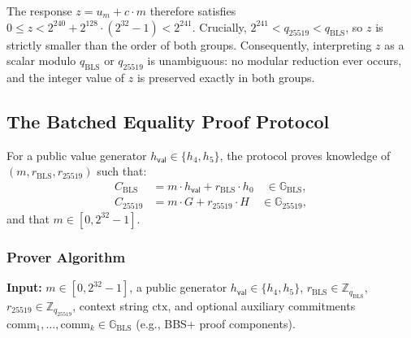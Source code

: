 \documentclass[11pt]{article}
\theoremstyle{definitionstyle}
\theoremstyle{plain}
\begin{document}
The response $z = u_m + c \cdot m$ therefore satisfies $0 \le z < 2^{240} + 2^{128} \cdot (2^{32}-1) < 2^{241}$. Crucially, $2^{241} < q_{25519} < q_{\text{BLS}}$, so $z$ is strictly smaller than the order of both groups. Consequently, interpreting $z$ as a scalar modulo $q_{\text{BLS}}$ or $q_{25519}$ is unambiguous: no modular reduction ever occurs, and the integer value of $z$ is preserved exactly in both groups.

\subsection{The Batched Equality Proof Protocol}
\label{sec:crosscurve}

For a public value generator $h_{\mathsf{val}} \in \{h_4, h_5\}$, the protocol proves knowledge of $(m, r_{\text{BLS}}, r_{25519})$ such that:
\[
\begin{aligned}
C_{\text{BLS}} &= m \cdot h_{\mathsf{val}} + r_{\text{BLS}} \cdot h_0 \quad \in \mathbb{G}_{\text{BLS}}, \\
C_{25519} &= m \cdot G + r_{25519} \cdot H \quad \in \mathbb{G}_{25519},
\end{aligned}
\]
and that $m \in [0, 2^{32}-1]$.

\subsubsection{Prover Algorithm}

\textbf{Input:} $m \in [0, 2^{32}-1]$, a public generator $h_{\mathsf{val}} \in \{h_4,h_5\}$, $r_{\text{BLS}} \in \mathbb{Z}_{q_{\text{BLS}}}$, $r_{25519} \in \mathbb{Z}_{q_{25519}}$, context string $\text{ctx}$, and optional auxiliary commitments $\text{comm}_1,\dots,\text{comm}_k \in \mathbb{G}_{\text{BLS}}$ (e.g., BBS+ proof components).
\end{document}
